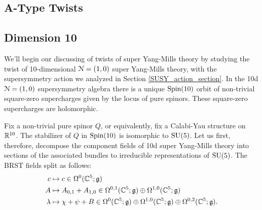 \documentclass[10pt, oneside]{article}
\begin{document}
\subsection{A-Type Twists} \label{A_twist_section}

\subsection{Dimension 10}
We'll begin our discussing of twists of super Yang-Mills theory by studying the twist of 10-dimensional $\mathcal{N}=(1,0)$ super Yang-Mills theory, with the supersymmetry action we analyzed in Section \ref{SUSY_action_section}.  In the 10d $\mathcal{N}=(1,0)$ supersymmetry algebra there is a unique $\mathrm{Spin}(10)$ orbit of non-trivial square-zero supercharges given by the locus of pure spinors.  These square-zero supercharges are holomorphic.

Fix a non-trivial pure spinor $Q$, or equivalently, fix a Calabi-Yau structure on $\mathbb R^{10}$.  The stabilizer of $Q$ in $\mathrm{Spin}(10)$ is isomorphic to $\mathrm{SU}(5)$.  Let us first, therefore, decompose the component fields of 10d super Yang-Mills theory into sections of the associated bundles to irreducible representations of $\mathrm{SU}(5)$.  The BRST fields split as follows:
\begin{align*}
c &\mapsto c \in \Omega^0(\mathbb C^5; \mathfrak{g}) \\
A &\mapsto A_{0, 1} + A_{1, 0} \in \Omega^{0,1}(\mathbb C^5; \mathfrak{g}) \oplus \Omega^{1,0}(\mathbb C^5; \mathfrak{g})\\
\lambda &\mapsto \chi + \psi + B \in \Omega^0(\mathbb C^5; \mathfrak{g}) \oplus \Omega^{1,0}(\mathbb C^5; \mathfrak{g}) \oplus \Omega^{0,2}(\mathbb C^5; \mathfrak{g}). 
\end{align*}
\end{document}
